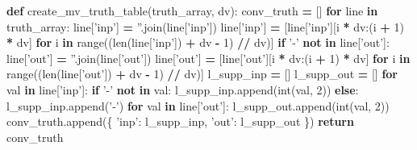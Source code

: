 \documentclass[italian,]{book}
\newenvironment{Shaded}{\begin{snugshade}}{\end{snugshade}}
\newcommand{\BuiltInTok}[1]{#1}
\newcommand{\ControlFlowTok}[1]{\textcolor[rgb]{0.13,0.29,0.53}{\textbf{#1}}}
\newcommand{\DecValTok}[1]{\textcolor[rgb]{0.00,0.00,0.81}{#1}}
\newcommand{\KeywordTok}[1]{\textcolor[rgb]{0.13,0.29,0.53}{\textbf{#1}}}
\newcommand{\NormalTok}[1]{#1}
\newcommand{\OperatorTok}[1]{\textcolor[rgb]{0.81,0.36,0.00}{\textbf{#1}}}
\newcommand{\StringTok}[1]{\textcolor[rgb]{0.31,0.60,0.02}{#1}}
\begin{document}
\begin{Shaded}
\begin{Highlighting}[]
\KeywordTok{def}\NormalTok{ create_mv_truth_table(truth_array, dv):}
\NormalTok{  conv_truth }\OperatorTok{=}\NormalTok{ []}
  \ControlFlowTok{for}\NormalTok{ line }\KeywordTok{in}\NormalTok{ truth_array:}
\NormalTok{    line[}\StringTok{'inp'}\NormalTok{] }\OperatorTok{=} \StringTok{''}\NormalTok{.join(line[}\StringTok{'inp'}\NormalTok{])}
\NormalTok{    line[}\StringTok{'inp'}\NormalTok{] }\OperatorTok{=}\NormalTok{ [line[}\StringTok{'inp'}\NormalTok{][i }\OperatorTok{*}\NormalTok{ dv:(i }\OperatorTok{+} \DecValTok{1}\NormalTok{) }\OperatorTok{*}\NormalTok{ dv]}
      \ControlFlowTok{for}\NormalTok{ i }\KeywordTok{in} \BuiltInTok{range}\NormalTok{((}\BuiltInTok{len}\NormalTok{(line[}\StringTok{'inp'}\NormalTok{]) }\OperatorTok{+}\NormalTok{ dv }\OperatorTok{-} \DecValTok{1}\NormalTok{) }\OperatorTok{//}\NormalTok{ dv)]}
    \ControlFlowTok{if} \StringTok{'-'} \KeywordTok{not} \KeywordTok{in}\NormalTok{ line[}\StringTok{'out'}\NormalTok{]:}
\NormalTok{      line[}\StringTok{'out'}\NormalTok{] }\OperatorTok{=} \StringTok{''}\NormalTok{.join(line[}\StringTok{'out'}\NormalTok{])}
\NormalTok{      line[}\StringTok{'out'}\NormalTok{] }\OperatorTok{=}\NormalTok{ [line[}\StringTok{'out'}\NormalTok{][i }\OperatorTok{*}\NormalTok{ dv:(i }\OperatorTok{+} \DecValTok{1}\NormalTok{) }\OperatorTok{*}\NormalTok{ dv]}
        \ControlFlowTok{for}\NormalTok{ i }\KeywordTok{in} \BuiltInTok{range}\NormalTok{((}\BuiltInTok{len}\NormalTok{(line[}\StringTok{'out'}\NormalTok{]) }\OperatorTok{+}\NormalTok{ dv }\OperatorTok{-} \DecValTok{1}\NormalTok{) }\OperatorTok{//}\NormalTok{ dv)]}
\NormalTok{      l_supp_inp }\OperatorTok{=}\NormalTok{ []}
\NormalTok{      l_supp_out }\OperatorTok{=}\NormalTok{ []}
      \ControlFlowTok{for}\NormalTok{ val }\KeywordTok{in}\NormalTok{ line[}\StringTok{'inp'}\NormalTok{]:}
        \ControlFlowTok{if} \StringTok{'-'} \KeywordTok{not} \KeywordTok{in}\NormalTok{ val:}
\NormalTok{          l_supp_inp.append(}\BuiltInTok{int}\NormalTok{(val, }\DecValTok{2}\NormalTok{))}
        \ControlFlowTok{else}\NormalTok{:}
\NormalTok{          l_supp_inp.append(}\StringTok{'-'}\NormalTok{)}
      \ControlFlowTok{for}\NormalTok{ val }\KeywordTok{in}\NormalTok{ line[}\StringTok{'out'}\NormalTok{]:}
\NormalTok{        l_supp_out.append(}\BuiltInTok{int}\NormalTok{(val, }\DecValTok{2}\NormalTok{))}
\NormalTok{      conv_truth.append(\{}
        \StringTok{'inp'}\NormalTok{:  l_supp_inp,}
        \StringTok{'out'}\NormalTok{:  l_supp_out}
\NormalTok{      \})}
  \ControlFlowTok{return}\NormalTok{ conv_truth}
\end{Highlighting}
\end{Shaded}
\end{document}
